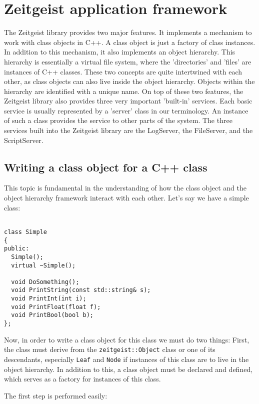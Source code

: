 \chapter{Zeitgeist application framework}

The Zeitgeist library provides two major features. It implements a
mechanism to work with class objects in C++. A class object is just a
factory of class instances. In addition to this mechanism, it also
implements an object hierarchy. This hierarchy is essentially a
virtual file system, where the 'directories' and 'files' are instances
of C++ classes. These two concepts are quite intertwined with each
other, as class objects can also live inside the object
hierarchy. Objects within the hierarchy are identified with a unique
name. On top of these two features, the Zeitgeist library also
provides three very important 'built-in' services. Each basic service
is usually represented by a 'server' class in our terminology. An
instance of such a class provides the service to other parts of the
system. The three services built into the Zeitgeist library are the
LogServer, the FileServer, and the ScriptServer.

\section{Writing a class object for a C++ class}
\label{sec:classobj}

This topic is fundamental in the understanding of how the class object
and the object hierarchy framework interact with each other. Let's say
we have a simple class:

\begin{verbatim}

class Simple
{
public:
  Simple();
  virtual ~Simple();
  
  void DoSomething();
  void PrintString(const std::string& s);
  void PrintInt(int i);
  void PrintFloat(float f);
  void PrintBool(bool b);
};

\end{verbatim}

Now, in order to write a class object for this class we must do two
things: First, the class must derive from the
\texttt{zeitgeist::Object} class or one of its descendants,
especially \texttt{Leaf} and \texttt{Node} if instances of this class
are to live in the object hierarchy. In addition to this, a class
object must be declared and defined, which serves as a factory for
instances of this class.

The first step is performed easily:

